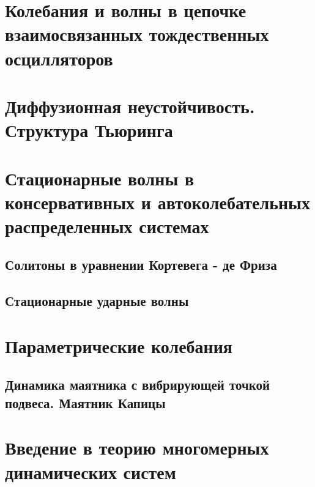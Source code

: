 \documentclass[a4paper,14pt]{extarticle}
\theoremstyle{definition}
\begin{document}


\newpage
\tableofcontents 

\newpage
\section{Колебания и волны в цепочке взаимосвязанных тождественных осцилляторов}
\label{sec:osci_and_wave_in_ordered_struct}
	

\newpage
\section{Диффузионная неустойчивость. Структура Тьюринга}
\label{sec:diffusion_instability}
	



\newpage
\section{Стационарные волны в консервативных и автоколебательных распределенных системах}
\label{sec:volnu}
	\subsection{Солитоны в уравнении Кортевега - де Фриза}
	\label{ssec:soliton}
		

	\subsection{Стационарные ударные волны}
	\label{ssec:shock_waves}
		

\newpage
\section{Параметрические колебания}
\label{sec:parametric_oscillations}
	
	
	\subsection{Динамика маятника с вибрирующей точкой подвеса. Маятник Капицы}
	\label{ssec:kap_pendulum}
		

\newpage
\section{Введение в теорию многомерных динамических систем}
\label{sec:multidimensional_dynamic_systems}
	
\end{document}

